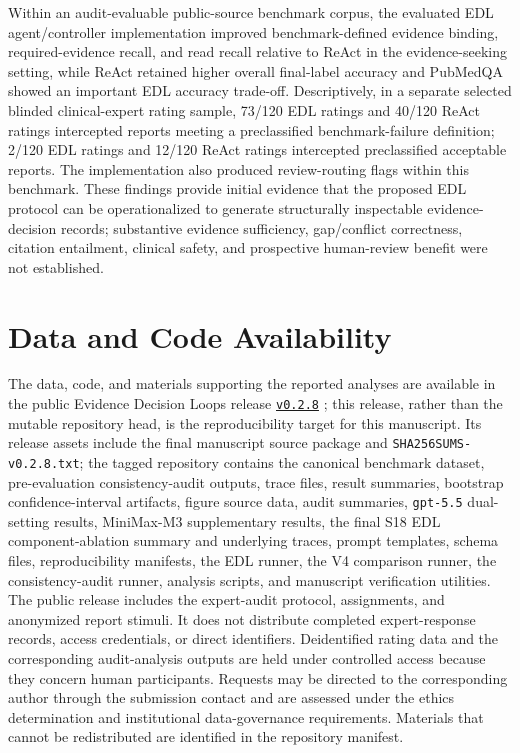 \documentclass[11pt,a4paper]{article}
\begin{document}
Within an audit-evaluable public-source benchmark corpus, the evaluated EDL agent/controller implementation improved benchmark-defined evidence binding, required-evidence recall, and read recall relative to ReAct in the evidence-seeking setting, while ReAct retained higher overall final-label accuracy and PubMedQA showed an important EDL accuracy trade-off. Descriptively, in a separate selected blinded clinical-expert rating sample, 73/120 EDL ratings and 40/120 ReAct ratings intercepted reports meeting a preclassified benchmark-failure definition; 2/120 EDL ratings and 12/120 ReAct ratings intercepted preclassified acceptable reports. The implementation also produced review-routing flags within this benchmark. These findings provide initial evidence that the proposed EDL protocol can be operationalized to generate structurally inspectable evidence-decision records; substantive evidence sufficiency, gap/conflict correctness, citation entailment, clinical safety, and prospective human-review benefit were not established.

\section*{Data and Code Availability}

The data, code, and materials supporting the reported analyses are available in the public Evidence Decision Loops release \href{https://github.com/xiaoxubeii/evidence-decision-loops/releases/tag/v0.2.8}{\texttt{v0.2.8}} \cite{eviagent2026artifacts,eviagent2026software}; this release, rather than the mutable repository head, is the reproducibility target for this manuscript. Its release assets include the final manuscript source package and \texttt{SHA256SUMS-v0.2.8.txt}; the tagged repository contains the canonical benchmark dataset, pre-evaluation consistency-audit outputs, trace files, result summaries, bootstrap confidence-interval artifacts, figure source data, audit summaries, \texttt{gpt-5.5} dual-setting results, MiniMax-M3 supplementary results, the final S18 EDL component-ablation summary and underlying traces, prompt templates, schema files, reproducibility manifests, the EDL runner, the V4 comparison runner, the consistency-audit runner, analysis scripts, and manuscript verification utilities. The public release includes the expert-audit protocol, assignments, and anonymized report stimuli. It does not distribute completed expert-response records, access credentials, or direct identifiers. Deidentified rating data and the corresponding audit-analysis outputs are held under controlled access because they concern human participants. Requests may be directed to the corresponding author through the submission contact and are assessed under the ethics determination and institutional data-governance requirements. Materials that cannot be redistributed are identified in the repository manifest.
\end{document}
